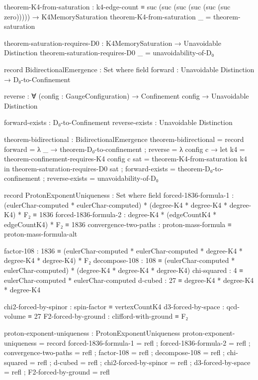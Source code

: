 \documentclass[11pt,a4paper]{book}
\begin{document}
\begin{code}
theorem-K4-from-saturation : 
  k4-edge-count ≡ suc (suc (suc (suc (suc (suc zero))))) →
  K4MemorySaturation
theorem-K4-from-saturation _ = theorem-saturation

theorem-saturation-requires-D0 : K4MemorySaturation → Unavoidable Distinction
theorem-saturation-requires-D0 _ = unavoidability-of-D₀

record BidirectionalEmergence : Set where
  field
    forward : Unavoidable Distinction → D₀-to-Confinement
    
    reverse : ∀ (config : GaugeConfiguration) → 
              Confinement config → Unavoidable Distinction
    
    forward-exists : D₀-to-Confinement
    reverse-exists : Unavoidable Distinction

theorem-bidirectional : BidirectionalEmergence
theorem-bidirectional = record
  { forward   = λ _ → theorem-D₀-to-confinement
  ; reverse   = λ config c → 
      let k4 = theorem-confinement-requires-K4 config c
          sat = theorem-K4-from-saturation k4
      in theorem-saturation-requires-D0 sat
  ; forward-exists = theorem-D₀-to-confinement
  ; reverse-exists = unavoidability-of-D₀
  }

record ProtonExponentUniqueness : Set where
  field
    forced-1836-formula-1   : (eulerChar-computed * eulerChar-computed) * (degree-K4 * degree-K4 * degree-K4) * F₂ ≡ 1836
    forced-1836-formula-2   : degree-K4 * (edgeCountK4 * edgeCountK4) * F₂ ≡ 1836
    convergence-two-paths   : proton-mass-formula ≡ proton-mass-formula-alt
    
    factor-108 : 1836 ≡ (eulerChar-computed * eulerChar-computed * degree-K4 * degree-K4 * degree-K4) * F₂
    decompose-108 : 108 ≡ (eulerChar-computed * eulerChar-computed) * (degree-K4 * degree-K4 * degree-K4)
    chi-squared : 4 ≡ eulerChar-computed * eulerChar-computed
    d-cubed : 27 ≡ degree-K4 * degree-K4 * degree-K4
    
    chi2-forced-by-spinor : spin-factor ≡ vertexCountK4
    d3-forced-by-space : qcd-volume ≡ 27
    F2-forced-by-ground : clifford-with-ground ≡ F₂

proton-exponent-uniqueness : ProtonExponentUniqueness
proton-exponent-uniqueness = record
  { forced-1836-formula-1 = refl
  ; forced-1836-formula-2 = refl
  ; convergence-two-paths = refl
  ; factor-108 = refl
  ; decompose-108 = refl
  ; chi-squared = refl
  ; d-cubed = refl
  ; chi2-forced-by-spinor = refl
  ; d3-forced-by-space = refl
  ; F2-forced-by-ground = refl
  }



\end{code}
\end{document}
